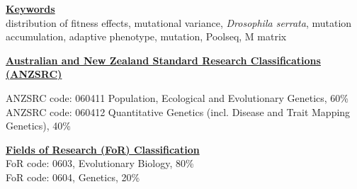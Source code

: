 \noindent\textbf{\underline{Keywords}}\\
\bigskip
\noindent 
distribution of fitness effects, mutational variance, \textit{Drosophila serrata}, mutation accumulation, adaptive phenotype, mutation, Poolseq, M matrix
\vspace{36pt}

\noindent\textbf{\underline{Australian and New Zealand Standard Research Classifications (ANZSRC)}}\\
\bigskip
\noindent 



ANZSRC code: 060411 Population, Ecological and Evolutionary Genetics, 60\% \\
\indent ANZSRC code: 060412 Quantitative Genetics (incl. Disease and Trait Mapping Genetics), 40\% \\
\vspace{36pt}


\noindent\textbf{\underline{Fields of Research (FoR) Classification}}\\
\bigskip
FoR code: 0603, Evolutionary Biology, 80\% \\
\indent FoR code: 0604, Genetics, 20\% \\



